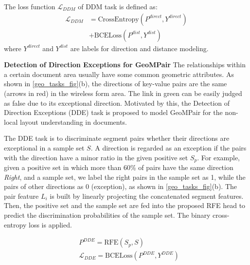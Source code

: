 \documentclass[10pt,twocolumn,letterpaper]{article}
\begin{document}
The loss function $\mathcal{L}_{DDM}$ of DDM task is defined as:
\vspace{-2mm}
\begin{equation}
  \begin{aligned}
  \mathcal{L}_{DDM} &= \mathrm{CrossEntropy}(P^{direct},Y^{direct}) \\
  &+ \mathrm{BCELoss}(P^{dist},Y^{dist})
  \end{aligned}
  \label{loss_ddm}
\end{equation}
where $Y^{direct}$ and $Y^{dist}$ are labels for direction and distance modeling.



\noindent\textbf{Detection of Direction Exceptions for GeoMPair} The relationships within a certain document area usually have some common geometric attributes. As shown in \cref{geo_tasks_fig}(b), the directions of key-value pairs are the same (arrows in red) in the wireless form area. The link in green can be easily judged as false due to its exceptional direction.
Motivated by this, the Detection of Direction Exceptions (DDE) task is proposed to model GeoMPair for the non-local layout understanding in documents.

The DDE task is to discriminate segment pairs whether their directions are exceptional in a \textsf{sample set} $S$.
A direction is regarded as an exception if the pairs with the direction have a minor ratio in the given \textsf{positive set} $S_p$.
For example, given a positive set in which more than 60\% of pairs have the same direction \textit{Right}, and a sample set, we label the right pairs in the sample set as 1, while the pairs of other directions as 0 (exception), as shown in \cref{geo_tasks_fig}(b).
The pair feature $L_i$ is built by linearly projecting the concatenated segment features.
Then, the positive set and the sample set are fed into the proposed RFE head to predict the discrimination probabilities of the sample set. The binary cross-entropy loss is applied.
\vspace{-2mm}

\begin{align}
  &P^{DDE} = \mathrm{RFE}(S_p,S) \\
  &\mathcal{L}_{DDE} = \mathrm{BCELoss}(P^{DDE}, Y^{DDE})
  \label{rfe_out}
\end{align}
\end{document}
